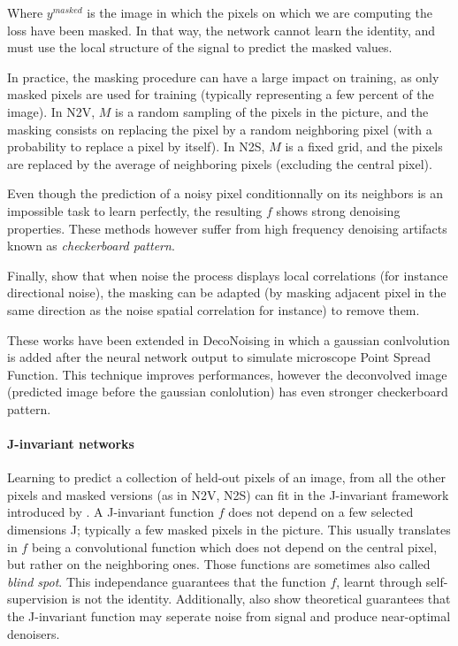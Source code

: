 \documentclass{article}
\begin{document}
Where $y^{masked}$ is the image in which the pixels on which we are computing the loss have been masked. In that way, the network cannot learn the identity, and must use the local structure of the signal to predict the masked values.

In practice, the masking procedure can have a large impact on training, as only masked pixels are used for training (typically representing a few percent of the image). In N2V, $M$ is a random sampling of the pixels in the picture, and the masking consists on replacing the pixel by a random neighboring pixel (with a probability to replace a pixel by itself). In N2S, $M$ is a fixed grid, and the pixels are replaced by the average of neighboring pixels (excluding the central pixel).

Even though the prediction of a noisy pixel conditionnally on its neighbors is an impossible task to learn perfectly, the resulting $f$ shows strong denoising properties. These methods however suffer from high frequency denoising artifacts known as \textit{checkerboard pattern}.

Finally, \cite{broaddus2020removing} show that when noise the process displays local correlations (for instance directional noise), the masking can be adapted (by masking adjacent pixel in the same direction as the noise spatial correlation for instance) to remove them.

These works have been extended in DecoNoising \cite{goncharova2020} in which a gaussian conlvolution is added after the neural network output to simulate microscope Point Spread Function. This technique improves performances, however the deconvolved image (predicted image before the gaussian conlolution) has even stronger checkerboard pattern.

\paragraph{J-invariant networks}
Learning to predict a collection of held-out pixels of an image, from all the other pixels and masked versions (as in N2V, N2S) can fit in the J-invariant framework introduced by \cite{batson2019noise2self}.
A J-invariant function $f$ does not depend on a few selected dimensions J; typically a few masked pixels
in the picture.
This usually translates in $f$ being a convolutional function which does not depend on the central pixel, but rather on the neighboring ones. Those functions are sometimes also called \textit{blind spot}.
 This independance guarantees that the function $f$, learnt through self-supervision is not the identity.
 Additionally, \cite{batson2019noise2self} also show theoretical guarantees that the J-invariant function may seperate noise from signal and produce near-optimal denoisers.
\end{document}
